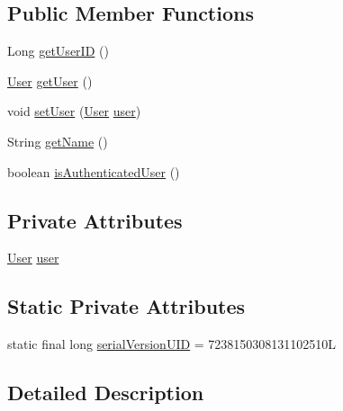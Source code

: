 \subsection*{Public Member Functions}
\begin{DoxyCompactItemize}
\item 
Long \hyperlink{classbr_1_1usp_1_1cata_1_1web_1_1controller_1_1_user_session_a59fe116c122f067e124082ac3a9277cd}{get\+User\+I\+D} ()
\item 
\hyperlink{classbr_1_1usp_1_1cata_1_1model_1_1_user}{User} \hyperlink{classbr_1_1usp_1_1cata_1_1web_1_1controller_1_1_user_session_ab2529477fe6c8dfee6a999dbd2688e6f}{get\+User} ()
\item 
void \hyperlink{classbr_1_1usp_1_1cata_1_1web_1_1controller_1_1_user_session_ae6f6d8aedf45fcd5aa89f90a115fee5d}{set\+User} (\hyperlink{classbr_1_1usp_1_1cata_1_1model_1_1_user}{User} \hyperlink{classbr_1_1usp_1_1cata_1_1web_1_1controller_1_1_user_session_ae1952fcc882c83995c670f1223a8ef58}{user})
\item 
String \hyperlink{classbr_1_1usp_1_1cata_1_1web_1_1controller_1_1_user_session_a518dda83954fc607a4b418037d4e7b23}{get\+Name} ()
\item 
boolean \hyperlink{classbr_1_1usp_1_1cata_1_1web_1_1controller_1_1_user_session_a6dd8d6847eac9be1e2e2e196322d1194}{is\+Authenticated\+User} ()
\end{DoxyCompactItemize}
\subsection*{Private Attributes}
\begin{DoxyCompactItemize}
\item 
\hyperlink{classbr_1_1usp_1_1cata_1_1model_1_1_user}{User} \hyperlink{classbr_1_1usp_1_1cata_1_1web_1_1controller_1_1_user_session_ae1952fcc882c83995c670f1223a8ef58}{user}
\end{DoxyCompactItemize}
\subsection*{Static Private Attributes}
\begin{DoxyCompactItemize}
\item 
static final long \hyperlink{classbr_1_1usp_1_1cata_1_1web_1_1controller_1_1_user_session_a85159fe8fe1d01723d32cdd37074bc5a}{serial\+Version\+U\+I\+D} = 7238150308131102510\+L
\end{DoxyCompactItemize}


\subsection{Detailed Description}



